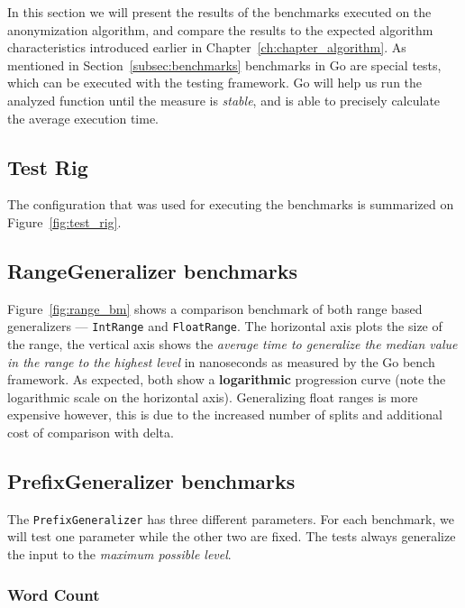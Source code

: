 In this section we will present the results of the benchmarks executed on the anonymization algorithm, and compare the results to the expected algorithm characteristics introduced earlier in Chapter~\ref{ch:chapter_algorithm}. As mentioned in Section~\ref{subsec:benchmarks} benchmarks in Go are special tests, which can be executed with the testing framework. Go will help us run the analyzed function until the measure is \emph{stable}, and is able to precisely calculate the average execution time.

\subsection{Test Rig}

The configuration that was used for executing the benchmarks is summarized on Figure~\ref{fig:test_rig}.


\subsection{RangeGeneralizer benchmarks}\label{subsec:range_generalizer_benchmarks}

Figure~\ref{fig:range_bm} shows a comparison benchmark of both range based generalizers --- \texttt{IntRange} and \texttt{FloatRange}. The horizontal axis plots the size of the range, the vertical axis shows the \emph{average time to generalize the median value in the range to the highest level} in nanoseconds as measured by the Go bench framework. As expected, both show a \textbf{logarithmic} progression curve (note the logarithmic scale on the horizontal axis). Generalizing float ranges is more expensive however, this is due to the increased number of splits and additional cost of comparison with delta.

\vspace{\baselineskip}


\subsection{PrefixGeneralizer benchmarks}

The \texttt{PrefixGeneralizer} has three different parameters. For each benchmark, we will test one parameter while the other two are fixed. The tests always generalize the input to the \emph{maximum possible level}.

\subsubsection{Word Count}

